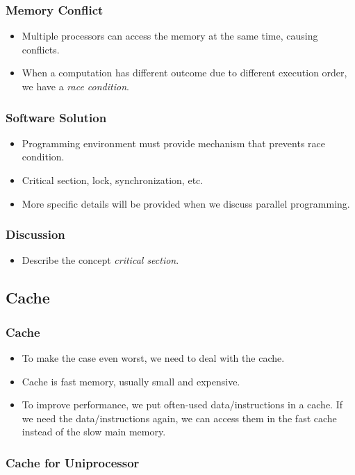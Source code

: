 \documentclass{beamer}
\begin{document}
\begin{CJK}{UTF8}{bsmi}
\begin{frame}
\frametitle{Memory Conflict}
\begin{itemize}
\item Multiple processors can access the memory at the same time,
  causing conflicts.
\item When a computation has different outcome due to different
  execution order, we have a {\em race condition}.
\end{itemize}
\end{frame}

\begin{frame}
\frametitle{Software Solution}
\begin{itemize}
\item Programming environment must provide mechanism that prevents
  race condition.
\item Critical section, lock, synchronization, etc.
\item More specific details will be provided when we discuss parallel
  programming.
\end{itemize}
\end{frame}


\begin{frame}
\frametitle{Discussion}
\begin{itemize}
\item Describe the concept {\em critical section}.
\end{itemize}
\end{frame}


\subsection{Cache}

\begin{frame}
\frametitle{Cache}
\begin{itemize}
\item To make the case even worst, we need to deal with the cache.
\item Cache is fast memory, usually small and expensive.
\item To improve performance, we put often-used data/instructions in a  cache. 
If we need the data/instructions again, we can access them in the fast cache instead of the slow main memory.
\end{itemize}
\end{frame}

\begin{frame}
\frametitle{Cache for Uniprocessor}
\centerline{}
\end{frame}


\end{CJK}
\end{document}
